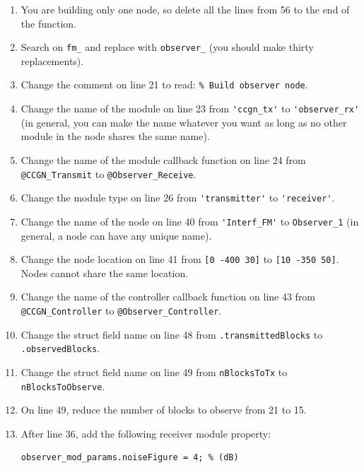 \setcounter{enumitemp}{\theenumi}
\begin{enumerate}
\setcounter{enumi}{\theenumitemp}

\item You are building only one node, so delete all the lines from 56 to the end of the function.

\item Search on \verb+fm_+ and replace with \verb+observer_+ (you should make thirty replacements).

\item Change the comment on line 21 to read: \verb+% Build observer node+.

\item Change the name of the module on line 23 from \verb+'ccgn_tx'+ to \verb+'observer_rx'+ (in general, you can make the name whatever you want as long as no other module in the node shares the same name).

\item Change the name of the module callback function on line 24 from \verb+@CCGN_Transmit+ to \verb+@Observer_Receive+.

\item Change the module type on line 26 from \verb+'transmitter'+ to \verb+'receiver'+.

\item Change the name of the node on line 40 from \verb+'Interf_FM'+ to \verb+Observer_1+ (in general, a node can have any unique name).

\item Change the node location on line 41 from \verb+[0 -400 30]+ to \verb+[10 -350 50]+. Nodes cannot share the same location.

\item Change the name of the controller callback function on line 43 from \verb+@CCGN_Controller+ to \verb+@Observer_Controller+.

\item Change the struct field name on line 48 from \verb+.transmittedBlocks+ to \verb+.observedBlocks+.

\item Change the struct field name on line 49 from \verb+nBlocksToTx+ to \verb+nBlocksToObserve+.

\item On line 49, reduce the number of blocks to observe from 21 to 15.

\item After line 36, add the following receiver module property:
%
\begin{lstlisting}[numbers=none]
observer_mod_params.noiseFigure = 4; % (dB)
\end{lstlisting}

\end{enumerate}

